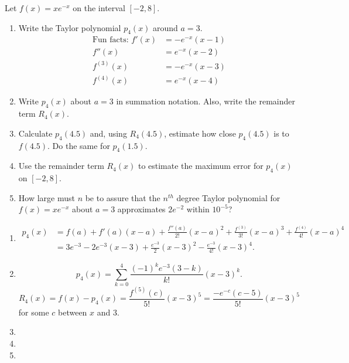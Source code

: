 \documentclass[handout,instructornotes]{ximera}
\begin{document}
\begin{problem}
Let $f(x) = xe^{-x}$ on the interval $[-2,8]$.  
	\begin{enumerate}
	
	\item  Write the Taylor polynomial $p_4(x)$ around $a=3$.
		\begin{align*}
		\text{Fun facts: } f'(x) &= -e^{-x}(x-1)  \\
		f''(x) &= e^{-x} (x-2) \\
		f^{(3)}(x) &= -e^{-x} (x-3) \\
		f^{(4)}(x) &= e^{-x} (x-4) 
		\end{align*}
	
	\item  Write $p_4(x)$ about $a=3$ in summation notation.  
	Also, write the remainder term $R_4(x)$.  
	
	\item  Calculate $p_4(4.5)$ and, using $R_4(4.5)$, estimate how close $p_4(4.5)$ is to $f(4.5)$.  
	Do the same for $p_4(1.5)$.  
	
	\item  Use the remainder term $R_4(x)$ to estimate the maximum error for $p_4(x)$ on $[-2,8]$.
	
	\item  How large must $n$ be to assure that the $n^{th}$ degree Taylor polynomial for $f(x) = xe^{-x}$ about $a=3$ approximates $2e^{-2}$ within $10^{-5}$?
	
	\end{enumerate}
	
	\begin{freeResponse}
	\begin{enumerate}
	
	\item  
		\begin{align*}
		p_4(x) &= f(a) + f'(a)(x-a) + \frac{f''(a)}{2!}(x-a)^2 + \frac{f^{(3)}}{3!}(x-a)^3 + \frac{f^{(4)}}{4!}(x-a)^4  \\
		&= 3e^{-3} -2e^{-3}(x-3) + \frac{e^{-3}}{2}(x-3)^2 - \frac{e^{-3}}{4!}(x-3)^4.
		\end{align*}
	
	\item  
		\[
		p_4(x) = \sum_{k=0}^4 \frac{(-1)^k e^{-3} (3-k)}{k!}(x-3)^k.
		\]
		\[
		R_4(x) = f(x)-p_4(x) = \frac{f^{(5)}(c)}{5!}(x-3)^5 = \frac{-e^{-c} (c-5)}{5!}(x-3)^5
		\]
	for some $c$ between $x$ and $3$.
	
	\item  
	
	\item  
	
	\item  
	
	\end{enumerate}
	\end{freeResponse}

\end{problem}
\end{document}
